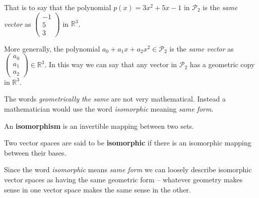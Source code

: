 That is to say that the polynomial $p(x) = 3x^2 + 5x-1$ in $\mathcal{P}_2$ is the {\it same
vector} as $\begin{pmatrix}-1\\5\\3\end{pmatrix}$ in $\mathbb{R}^3$.

More generally, the polynomial $a_0 + a_1 x + a_2 x^2 \in \mathcal{P}_2$ is the {\it same
vector} as $\begin{pmatrix}a_0\\a_1\\a_2\end{pmatrix} \in \mathbb{R}^3$.  In this way we
can say that any vector in $\mathcal{P}_2$ has a geometric copy in $\mathbb{R}^3$.  

The words {\it geometrically the same} are not very mathematical.  Instead a mathematician
would use the word {\it isomorphic} meaning {\it same form}.  
\begin{definition}[Isomorphism]
    An {\bf isomorphism} is an invertible mapping between two sets. 
\end{definition}

\begin{definition}
    Two vector spaces are said to be {\bf isomorphic} if there is an isomorphic mapping
    between their bases.
\end{definition}
Since the word {\it isomorphic} means {\it same form} we can loosely describe isomorphic
vector spaces as having the same geometric form -- whatever geometry makes sense in one
vector space makes the same sense in the other.

